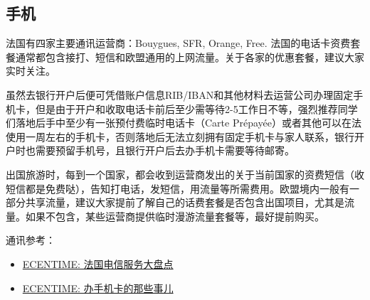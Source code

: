 \subsection{手机}

法国有四家主要通讯运营商：Bouygues, SFR, Orange, Free. 法国的电话卡资费套餐通常都包含接打、短信和欧盟通用的上网流量。关于各家的优惠套餐，建议大家实时关注。

虽然去银行开户后便可凭借账户信息RIB/IBAN和其他材料去运营公司办理固定手机卡，但是由于开户和收取电话卡前后至少需等待2-5工作日不等，强烈推荐同学们落地后手中至少有一张预付费临时电话卡（Carte Prépayée）或者其他可以在法使用一周左右的手机卡，否则落地后无法立刻拥有固定手机卡与家人联系，银行开户时也需要预留手机号，且银行开户后去办手机卡需要等待邮寄。

出国旅游时，每到一个国家，都会收到运营商发出的关于当前国家的资费短信（收短信都是免费哒），告知打电话，发短信，用流量等所需费用。欧盟境内一般有一部分共享流量，建议大家提前了解自己的话费套餐是否包含出国项目，尤其是流量。如果不包含，某些运营商提供临时漫游流量套餐等，最好提前购买。

通讯参考：
\begin{itemize}
    \item \href{https://www.ecentime.com/article/forfait-mobile-france}{ECENTIME: 法国电信服务大盘点}
    \item \href{https://www.ecentime.com/article/carte-sim}{ECENTIME: 办手机卡的那些事儿}
\end{itemize}
